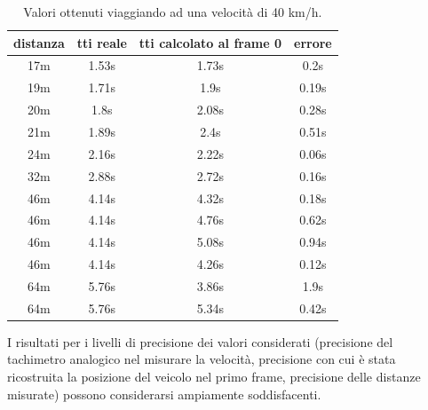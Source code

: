 \documentclass[12pt]{report}
\begin{document}
\begin{table}[H]
\centering
\begin{tabular}{|c|c|c|c|}
	\hline
	distanza & tti reale & \begin{minipage}{2.5cm}\centering tti calcolato al frame 0 \end{minipage}& errore\\[6pt] \hline
	17m	& 1.53s	& 1.73s	& 0.2s	\\ \hline
	19m	& 1.71s	& 1.9s	& 0.19s	\\ \hline
	20m	& 1.8s	& 2.08s	& 0.28s	\\ \hline
	21m	& 1.89s	& 2.4s	& 0.51s	\\ \hline
	24m	& 2.16s	& 2.22s	& 0.06s	\\ \hline
	32m	& 2.88s	& 2.72s	& 0.16s	\\ \hline
	46m	& 4.14s	& 4.32s	& 0.18s	\\ \hline
	46m	& 4.14s	& 4.76s	& 0.62s	\\ \hline
	46m	& 4.14s	& 5.08s	& 0.94s	\\ \hline
	46m	& 4.14s	& 4.26s	& 0.12s	\\ \hline
	64m	& 5.76s	& 3.86s	& 1.9s	\\ \hline
	64m	& 5.76s	& 5.34s	& 0.42s	\\ \hline

\end{tabular}
\caption{Valori ottenuti viaggiando ad una velocit\`a di 40 km/h.}
\end{table}

\noindent I risultati per i livelli di precisione dei valori considerati (precisione del tachimetro analogico nel misurare la velocit\`a, precisione con cui \`e stata ricostruita la posizione del veicolo nel primo frame, precisione delle distanze misurate) possono considerarsi ampiamente soddisfacenti.\\
\end{document}
